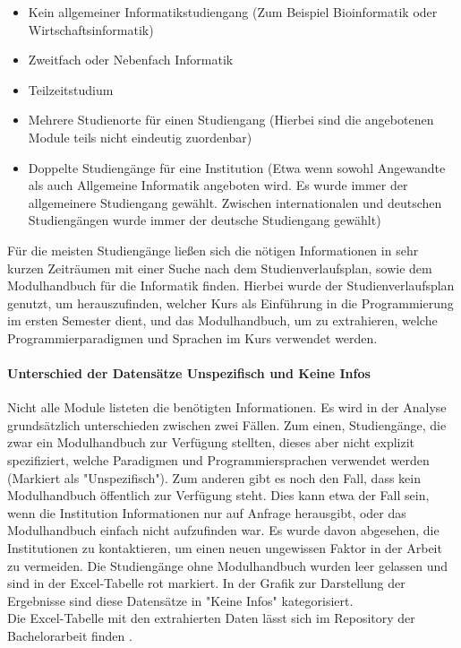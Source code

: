 \begin{itemize}
    \item Kein allgemeiner Informatikstudiengang (Zum Beispiel Bioinformatik oder Wirtschaftsinformatik)
    \item Zweitfach oder Nebenfach Informatik
    \item Teilzeitstudium
    \item Mehrere Studienorte für einen Studiengang (Hierbei sind die angebotenen Module teils nicht eindeutig zuordenbar)
    \item Doppelte Studiengänge für eine Institution (Etwa wenn sowohl Angewandte als auch Allgemeine Informatik angeboten wird. Es wurde immer der allgemeinere Studiengang gewählt. Zwischen internationalen und deutschen Studiengängen wurde immer der deutsche Studiengang gewählt)
\end{itemize}

Für die meisten Studiengänge ließen sich die nötigen Informationen in sehr kurzen Zeiträumen mit einer Suche nach dem Studienverlaufsplan, sowie dem Modulhandbuch für die Informatik finden.
Hierbei wurde der Studienverlaufsplan genutzt, um herauszufinden, welcher Kurs als Einführung in die Programmierung im ersten Semester dient, und das Modulhandbuch, um zu extrahieren, welche Programmierparadigmen und Sprachen im Kurs verwendet werden.

\paragraph{Unterschied der Datensätze Unspezifisch und Keine Infos}\label{sec:unspecified_vs_na}
Nicht alle Module listeten die benötigten Informationen. Es wird in der Analyse grundsätzlich unterschieden zwischen zwei Fällen. Zum einen, Studiengänge, die zwar ein Modulhandbuch zur Verfügung stellten, dieses aber nicht explizit spezifiziert, welche Paradigmen und Programmiersprachen verwendet werden (Markiert als "Unspezifisch"). Zum anderen gibt es noch den Fall, dass kein Modulhandbuch öffentlich zur Verfügung steht. Dies kann etwa der Fall sein, wenn die Institution Informationen nur auf Anfrage herausgibt, oder das Modulhandbuch einfach nicht aufzufinden war. Es wurde davon abgesehen, die Institutionen zu kontaktieren, um einen neuen ungewissen Faktor in der Arbeit zu vermeiden. Die Studiengänge ohne Modulhandbuch wurden leer gelassen und sind in der Excel-Tabelle rot markiert. In der Grafik zur Darstellung der Ergebnisse sind diese Datensätze in "Keine Infos" kategorisiert.
\\
Die Excel-Tabelle mit den extrahierten Daten lässt sich im Repository der Bachelorarbeit finden \cite{repoxlsx}.

